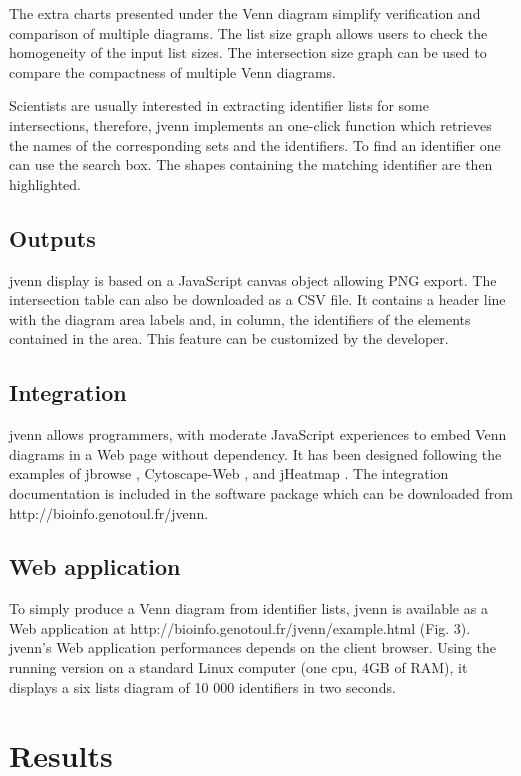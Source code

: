 \documentclass{bmcart}
\begin{document}
The extra charts presented under the Venn diagram simplify verification and
comparison of multiple diagrams. The list size graph allows users to check the
homogeneity of the input list sizes. The intersection size graph can be used to
compare the compactness of multiple Venn diagrams.

Scientists are usually interested in extracting identifier lists for some
intersections, therefore, jvenn implements an one-click function which retrieves
the names of the corresponding sets and the identifiers. To find an identifier
one can use the search box. The shapes containing the matching identifier are
then highlighted.

\subsection*{Outputs}

jvenn display is based on a JavaScript canvas object allowing PNG export. The 
intersection table can also be downloaded as a CSV file. It contains a header 
line with the diagram area labels and, in column, the identifiers of the
elements contained in the area. This feature can be customized by the
developer.

\subsection*{Integration}

jvenn allows programmers, with moderate JavaScript experiences to embed Venn
diagrams in a Web page without dependency. It has been designed following the
examples of jbrowse \cite{Westesson01032013}, Cytoscape-Web \cite{Lopes2010},
and jHeatmap \cite{DeuPons2014}.
The integration documentation is included in the software package which can be
downloaded from http://bioinfo.genotoul.fr/jvenn.

\subsection*{Web application}

To simply produce a Venn diagram from identifier lists, jvenn is 
available as a Web application at http://bioinfo.genotoul.fr/jvenn/example.html
(Fig. 3).
jvenn's Web application performances depends on the client browser. Using the running version
on a standard Linux computer (one cpu, 4GB of RAM), it displays a six lists
diagram of 10 000 identifiers in two seconds.


\section*{Results}
\end{document}
